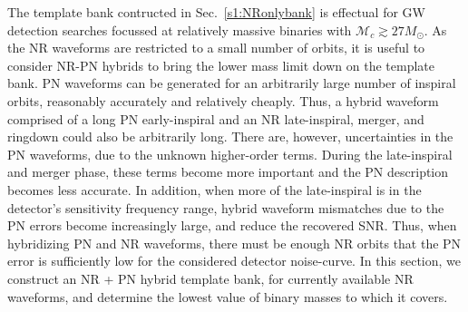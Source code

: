 
The template bank contructed in Sec.~\ref{s1:NRonlybank} is effectual for 
GW detection searches focussed at relatively massive binaries with 
$\mathcal{M}_c \gtrsim 27M_\odot$. As the NR waveforms are restricted to a
small number of orbits, it is useful to consider NR-PN hybrids to bring the
lower mass limit down on the template bank. PN waveforms can be generated
for an arbitrarily large number of inspiral orbits, reasonably accurately and
relatively cheaply. Thus, a hybrid waveform comprised of a long PN early-inspiral 
and an NR late-inspiral, merger, and ringdown could also be arbitrarily long. 
There are, however, uncertainties in the PN waveforms, due to
the unknown higher-order terms. During the late-inspiral and merger phase,
these terms become more important and the PN description becomes
less accurate. In addition, when more of the late-inspiral is
in the detector's sensitivity frequency range, hybrid waveform mismatches 
due to the PN errors become increasingly large, and reduce the
recovered SNR. Thus, when
hybridizing PN and NR waveforms, there must be enough NR orbits that the PN
error is sufficiently low for the considered detector noise-curve. In 
this section, we construct an NR + PN hybrid template bank, for currently
available NR waveforms, and determine the lowest value of binary masses to 
which it covers.


